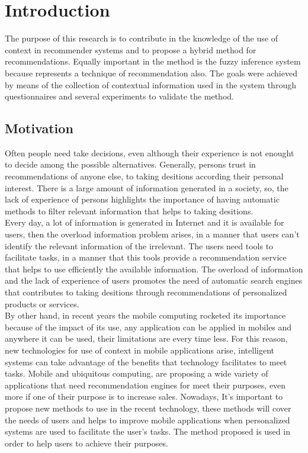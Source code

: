 \chapter{Introduction} \label{introduction} 

The purpose of this research is to contribute in the knowledge of the
use of context in recommender systems and to propose a hybrid method
for recommendations. Equally important in the method is the fuzzy
inference system because represents a
technique of recommendation also. The goals were achieved by means of
the collection of contextual information used in the system through
questionnaires and several experiments to validate the method.

\section{Motivation}

Often people need take decisions, even although their experience is
not enought to decide among the possible alternatives. Generally,
persons trust in recommendations of anyone else, to taking desitions
according their personal interest. There is a large amount of
information generated in a society, so, the lack of experience of
persons highlights the importance of having automatic methods to
filter relevant information that helps to taking desitions. \\Every day,
a lot of information is generated in Internet and it is available for
users, then the overload information problem arises, in a manner that
users can't identify the relevant information of the irrelevant. The
users need tools to facilitate tasks, in a manner that this tools
provide a recommendation service that helps to use efficiently the
available information. The overload of information and the lack of
experience of users promotes the need of automatic search engines
that contributes to taking desitions through recommendations of
personalized products or services. \\
By other hand, in recent years  the mobile computing rocketed its
importance because of the impact of its use, any application can be
applied in mobiles and anywhere it can be used, their limitations
are every time less. For this reason, new technologies for use of
context in mobile applications arise, intelligent systems can take
advantage of the benefits that technology facilitates to meet tasks.
Mobile and ubiquitous
computing\cite{noguera2012mobile},\cite{chiou2010adaptive} are
proposing a wide variety of applications that need recommendation
engines for meet their purposes, even more if one of their purpose 
is to increase sales.
Nowadays, It's important to propose new methods to use in the recent
technology, these methods will cover the needs of users and helps 
to improve mobile applications  when personalized systems are 
used to facilitate the user's tasks. The method proposed is used 
in order to help users to achieve their purposes.


